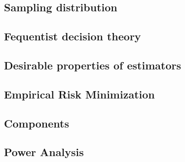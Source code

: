 \subsection{Sampling distribution}


\subsection{Fequentist decision theory}


\subsection{Desirable properties of estimators}


\subsection{Empirical Risk Minimization}


\subsection{Components}


\subsection{Power Analysis}


